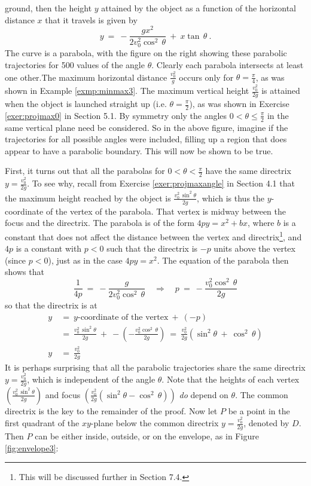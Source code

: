\begin{exmp}
ground, then the height $y$ attained by the object as a function of the
horizontal distance $x$ that it travels is given by
\[
y ~=~ -\frac{gx^2}{2v_0^2 \cos^2\,\theta} ~+~ x\tan\,\theta ~.
\]
The curve is a parabola, with the figure on the right showing these
parabolic trajectories for 500 values of the angle $\theta$. Clearly each
parabola intersects at least one other.The maximum
horizontal distance $\frac{v_0^2}{g}$ occurs only for $\theta=\frac{\pi}{4}$, as
was shown in Example \ref{exmp:minmax3}. The maximum vertical height
$\frac{v_0^2}{2g}$ is attained when the object is launched straight up (i.e.
$\theta = \frac{\pi}{2}$), as was shown in Exercise \ref{exer:projmax0} in
Section 5.1. By symmetry only the angles $0<\theta\le\frac{\pi}{2}$ in the same
vertical plane need be considered. So in the above figure, imagine if the
trajectories for all possible angles were included, filling up a region that
does appear to have a parabolic boundary. This will now be shown to be true.

First, it turns out that all the parabolas for $0<\theta<\frac{\pi}{2}$ have the
same directrix $y=\frac{v_0^2}{2g}$. To see why, recall from Exercise
\ref{exer:projmaxangle} in Section 4.1 that the maximum height reached by the
object is $\frac{v_0^2\,\sin^2 \theta}{2g}$, which is thus the $y$-coordinate of
the vertex of the parabola. That vertex is midway between the focus and the
directrix. The parabola is of the form $4py = x^2 + bx$, where $b$ is a constant
that does not affect the distance between the vertex and directrix\footnote{This
will be discussed further in Section 7.4.}, and $4p$ is a constant with $p<0$
such that the directrix is $-p$ units above the vertex (since $p<0$), just as in
the case $4py=x^2$. The equation of the parabola then shows that
\[
\frac{1}{4p} ~=~ -\frac{g}{2v_0^2 \cos^2\,\theta} \quad\Rightarrow\quad
p ~=~ -\frac{v_0^2 \cos^2\,\theta}{2g}
\]
so that the directrix is at
\begin{align*}
y ~&=~ \text{$y$-coordinate of the vertex} ~+~ (-p)\\
&=~ \frac{v_0^2\,\sin^2 \theta}{2g} ~+~ -\left(-\frac{v_0^2 \cos^2\,\theta}{2g}\right) ~=~
\frac{v_0^2}{2g}(\sin^2 \theta ~+~ \cos^2\,\theta)\\
y ~&=~ \frac{v_0^2}{2g}
\end{align*}
It is perhaps surprising that all the parabolic trajectories share the same
directrix $y=\frac{v_0^2}{2g}$, which is independent of the angle $\theta$. Note
that the heights of each vertex $\left(\frac{v_0^2\,\sin^2 \theta}{2g}\right)$
and focus $\left(\frac{v_0^2}{2g}(\sin^2 \theta - \cos^2\,\theta)\right)$
\emph{do} depend on $\theta$. The common directrix is the key to the remainder
of the proof.
\newpage
\noindent Now let $P$ be a point in the first quadrant of the $xy$-plane below
the common directrix $y=\frac{v_0^2}{2g}$, denoted by $D$. Then $P$ can be
either inside, outside, or on the envelope, as in Figure \ref{fig:envelope3}:


\end{exmp}
